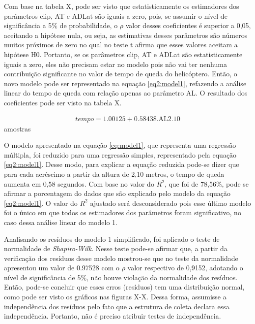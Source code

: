 Com base na tabela X, pode ser visto que estatisticamente os estimadores dos parâmetros clip, AT e ADLat são iguais a zero, pois, se assumir o nível de significância a 5\% de probabilidade, o $\rho$ valor desses coeficientes é superior a 0,05, aceitando a hipótese nula, ou seja, as estimativas desses parâmetros são números muitos próximos de zero no qual no teste t afirma que esses valores aceitam a hipótese H0. Portanto, se os parâmetros clip, AT e ADLat são estatisticamente iguais a zero, eles não precisam estar no modelo pois não vai ter nenhuma contribuição significante no valor de tempo de queda do helicóptero. Então, o novo modelo pode ser representado na equação \ref{eq2:model1}, refazendo a análise linear do tempo de queda com relação apenas ao parâmetro AL. O resultado dos coeficientes pode ser visto na tabela X.  


\begin{align}
    tempo = 1.00125 + 0.58438\text{.AL2.10}
    \label{eq2:model1}
\end{align}amostras

O modelo apresentado na equação \ref{eq:model1}, que representa uma regressão múltipla, foi reduzido para uma regressão simples, representado pela equação \ref{eq2:model1}. Desse modo, para explicar a equação reduzida pode-se dizer que para cada acréscimo a partir da altura de 2,10 metros, o tempo de queda aumenta em 0,58 segundos. Com base no valor do $R^2$, que foi de 78,56\%, pode se afirmar a porcentagem do dados que são explicado pelo modelo da equação \ref{eq2:model1}. O valor do $R^2$ ajustado será desconsiderado pois esse último modelo foi o único em que todos os estimadores dos parâmetros foram significativo, no caso dessa análise linear do modelo 1. 

Analisando os resíduos do modelo 1 simplificado, foi aplicado o teste de normalidade de \textit{Shapiro-Wilk}. Nesse teste pode-se afirmar que, a partir da verificação dos resíduos desse modelo mostrou-se que no teste da normalidade apresentou um valor de 0.97528 com o $\rho$ valor respectivo de 0,9152, adotando o nível de significância de 5\%, não houve violação da normalidade dos resíduos. Então, pode-se concluir que esses erros (resíduos) tem uma distribuição normal, como pode ser visto os gráficos nas figuras X-X. Dessa forma, assumisse a independência dos resíduos pelo fato que a estrutura de coleta declara essa independência. Portanto, não é preciso atribuir testes de independência.

